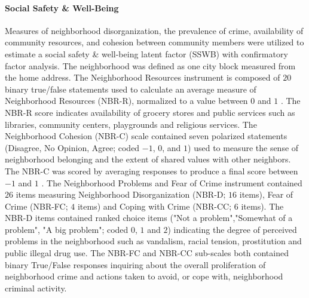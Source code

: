 \documentclass[utf8]{article}
\begin{document}
\paragraph{Social Safety \& Well-Being}
Measures of neighborhood disorganization, the prevalence of crime, availability of community resources, and cohesion between community members were utilized to estimate a social safety \& well-being latent factor (SSWB) with confirmatory factor analysis. The neighborhood was defined as one city block measured from the home address. The Neighborhood Resources instrument is composed of $20$ binary true/false statements used to calculate an average measure of Neighborhood Resources (NBR-R), normalized to a value between $0$ and $1$ \citep{tolan2001chicago}. The NBR-R score indicates availability of grocery stores and public services such as libraries, community centers, playgrounds and religious services. The Neighborhood Cohesion (NBR-C) scale contained seven polarized statements (Disagree, No Opinion, Agree; coded $-1$, $0$, and $1$) used to measure the sense of neighborhood belonging and the extent of shared values with other neighbors. The NBR-C was scored by averaging responses to produce a final score between $-1$ and $1$ \citep{perkins1990participation}. The Neighborhood Problems and Fear of Crime instrument contained $26$ items measuring Neighborhood Disorganization (NBR-D; $16$ items), Fear of Crime (NBR-FC; $4$ items) and Coping with Crime (NBR-CC; $6$ items). The NBR-D items contained ranked choice items ("Not a problem","Somewhat of a problem", "A big problem"; coded $0$, $1$ and $2$) indicating the degree of perceived problems in the neighborhood such as vandalism, racial tension, prostitution and public illegal drug use. The NBR-FC and NBR-CC sub-scales both contained binary True/False responses inquiring about the overall proliferation of neighborhood crime and actions taken to avoid, or cope with, neighborhood criminal activity. 
\end{document}
